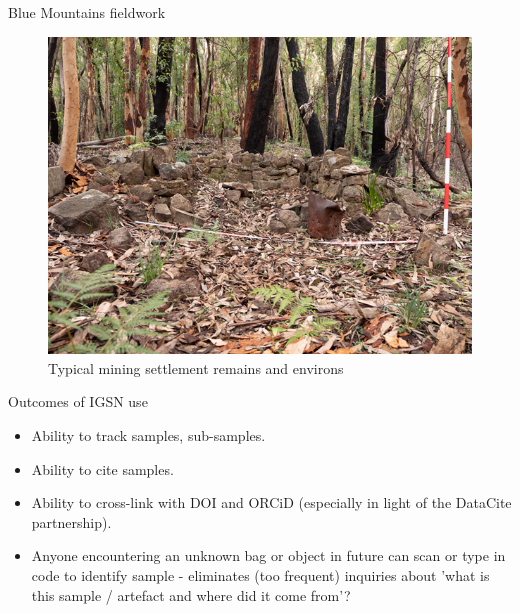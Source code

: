 \begin{frame}{Blue Mountains fieldwork}
 \begin{figure}[BM]
    \centering
    \vspace{-0.5cm}
        \includegraphics[height=.70\textheight]{figures/BM-fieldwork.png}
        \caption{Typical mining settlement remains and environs}
        \label{fig:Blue Mountains historical archaeology fieldwork}
 \end{figure}
\end{frame}
\begin{frame}{Outcomes of IGSN use}
    \begin{itemize}
        \item Ability to track samples, sub-samples.
        \item Ability to cite samples.
        \item Ability to cross-link with DOI and ORCiD (especially in light of the DataCite partnership).
        \item Anyone encountering an unknown bag or object in future can scan or type in code to identify sample - eliminates (too frequent) inquiries about 'what is this sample / artefact and where did it come from'?
    \end{itemize}
\end{frame}
